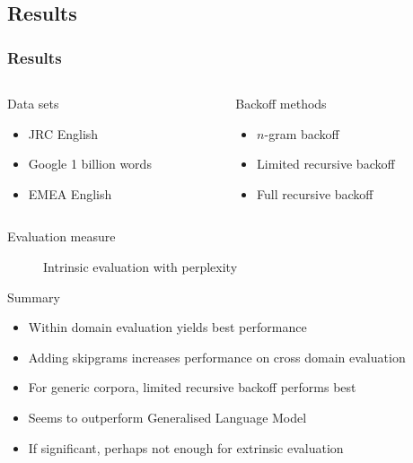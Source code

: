 \documentclass{beamer}
\begin{document}
\begin{frame}\section{Results}
    \frametitle{Results}

    \begin{columns}[T,totalwidth=\linewidth]
        \begin{column}{0.475\textwidth}
            \begin{block}{Data sets}
                \begin{itemize}
                    \item JRC English
                    \item Google 1 billion words
                    \item EMEA English
                \end{itemize}
            \end{block}
        \end{column}    
        \begin{column}{0.475\textwidth}
            \begin{block}{Backoff methods}
                \begin{itemize}
                    \item $n$-gram backoff
                    \item Limited recursive backoff
                    \item Full recursive backoff
                \end{itemize}
            \end{block}
        \end{column}    
    \end{columns}

    \begin{description}
        \item[Evaluation measure] Intrinsic evaluation with perplexity
    \end{description}

    \begin{block}{Summary}
        \begin{itemize}
            \item Within domain evaluation yields best performance
            \item Adding skipgrams increases performance on cross domain evaluation
            \item For generic corpora, limited recursive backoff performs best
            \item Seems to outperform Generalised Language Model
            \item If significant, perhaps not enough for extrinsic evaluation
        \end{itemize}
    \end{block}
\end{frame}
\end{document}
